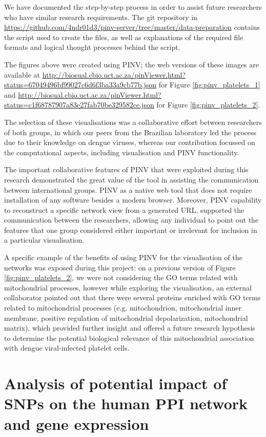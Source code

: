 We have documented the step-by-step process in order to assist future researchers who have similar research requirements. The git repository in \url{https://github.com/4ndr01d3/pinv-server/tree/master/data-preparation} contains the script used to create the files, as well as explanations of the required file formats and logical thought processes behind the script.

The figures above were created using PINV; the web versions of these images are available at \url{http://biosual.cbio.uct.ac.za/pinViewer.html?status=67049496bf99027c6d6f3ba33a9cb77b.json} for Figure \ref{fig:pinv_platelets_1} and \url{http://biosual.cbio.uct.ac.za/pinViewer.html?status=c1f68787907a83e27fab70be329582ce.json} for Figure \ref{fig:pinv_platelets_2}.

The selection of these visualisations was a collaborative effort between researchers of both groups, in which our peers from the Brazilian laboratory led the process due to their knowledge on dengue viruses, whereas our contribution focussed on the computational aspects, including visualisation and PINV functionality.

The important collaborative features of PINV that were exploited during this research demonstrated the great value of the tool in assisting the communication between international groups. PINV as a native web tool that does not require installation of any software besides a modern browser. Moreover, PINV capability to reconstruct a specific network view from a generated URL, supported the communication between the researchers, allowing any individual to point out the features that one group considered either important or irrelevant for inclusion in a particular visualisation.

A specific example of the benefits of using PINV for the visualisation of the networks was exposed during this project: on a previous version of Figure \ref{fig:pinv_platelets_2}, we were not considering the GO terms related with mitochondrial processes, however while exploring the visualisation, an external collaborator pointed out that there were several proteins enriched with GO terms related to mitochondrial processes (e.g. mitochondrion, mitochondrial inner membrane, positive regulation of mitochondrial depolarization, mitochondrial matrix), which provided further insight and offered a future research hypothesis to determine the potential biological relevance of this mitochondrial association with dengue viral-infected platelet cells.

\section{Analysis of potential impact of SNPs on the human PPI network and gene expression}
\label{sec:pop_genetics}
